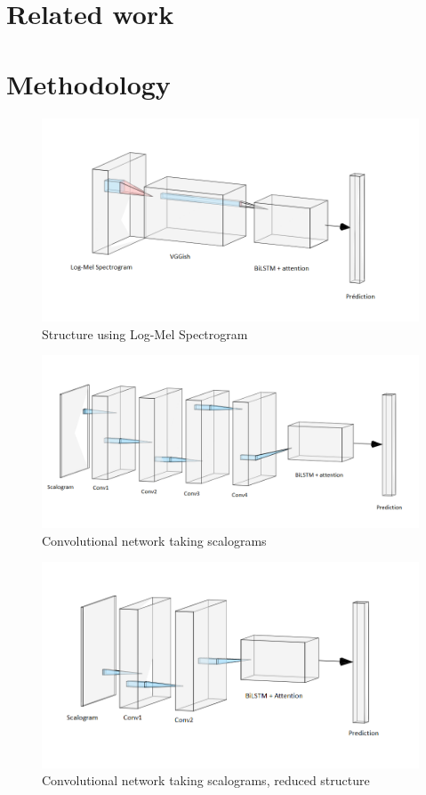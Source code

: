 \documentclass[final]{cvpr}
\begin{document}
\section{Related work}
\section{Methodology}
\begin{figure}
	\centering
	\includegraphics[scale = 0.45]{bilstm.png}
	\caption{Structure using Log-Mel Spectrogram}
	\label{mel}
\end{figure}
\begin{figure}
	\centering
	\includegraphics[scale = 0.65]{cnn.png}
	\caption{Convolutional network taking scalograms}
	\label{cnn}
\end{figure}
\begin{figure}
	\centering
	\includegraphics[scale = 0.45]{cnnreduit.png}
	\caption{Convolutional network taking scalograms, reduced structure}
	\label{reduit}
\end{figure}
\end{document}
